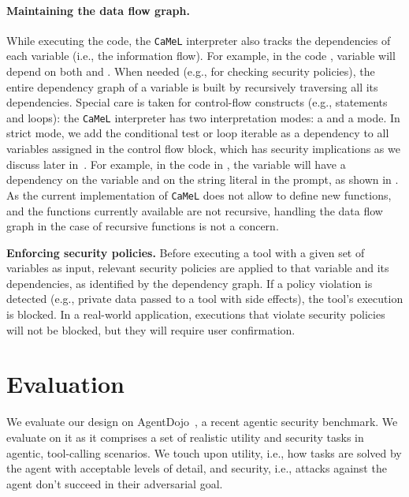 \documentclass[11pt, a4paper, logo, copyright]{googledeepmind}
\newcommand{\sysname}{\texttt{CaMeL}\xspace}
\begin{document}
\paragraph{Maintaining the data flow graph.} While executing the code, the \sysname interpreter also tracks the dependencies of each variable (i.e., the information flow). For example, in the code , variable  will depend on both  and . When needed (e.g., for checking security policies), the entire dependency graph of a variable is built by recursively traversing all its dependencies. Special care is taken for control-flow constructs (e.g.,  statements and  loops): the \sysname interpreter has two interpretation modes: a  and a  mode. In strict mode, we add the conditional test or loop iterable as a dependency to all variables assigned in the control flow block, which has security implications as we discuss later in~. For example, in the code in , the variable  will have a dependency on the variable  and on the string literal in the prompt, as shown in . As the current implementation of \sysname does not allow to define new functions, and the functions currently available are not recursive, handling the data flow graph in the case of recursive functions is not a concern.

\textbf{Enforcing security policies.} Before executing a tool with a given set of variables as input, relevant security policies are applied to that variable and its dependencies, as identified by the dependency graph. If a policy violation is detected (e.g., private data passed to a tool with side effects), the tool's execution is blocked. In a real-world application, executions that violate security policies will not be blocked, but they will require user confirmation.

\section{Evaluation}

We evaluate our design on AgentDojo~\citep{debenedetti2024agentdojo}, a recent agentic security benchmark. We evaluate on it as it comprises a set of realistic utility and security tasks in agentic, tool-calling scenarios. We touch upon utility, i.e., how tasks are solved by the agent with acceptable levels of detail, and security, i.e., attacks against the agent don't succeed in their adversarial goal.
\end{document}
